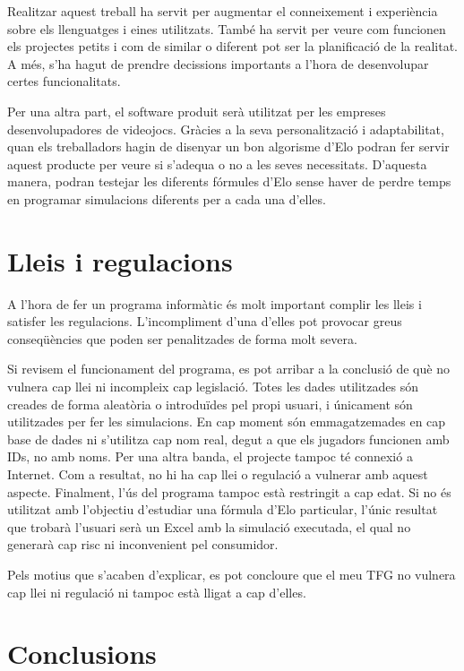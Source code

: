 \documentclass[a4paper]{article}
\begin{document}
Realitzar aquest treball ha servit per augmentar el conneixement i experiència sobre els llenguatges i eines utilitzats. També ha servit per veure com funcionen els projectes petits i com de similar o diferent pot ser la planificació de la realitat. A més, s'ha hagut de prendre decissions importants a l'hora de desenvolupar certes funcionalitats.

Per una altra part, el software produit serà utilitzat per les empreses desenvolupadores de videojocs. Gràcies a la seva personalització i adaptabilitat, quan els treballadors hagin de disenyar un bon algorisme d'Elo podran fer servir aquest producte per veure si s'adequa o no a les seves necessitats. D'aquesta manera, podran testejar les diferents fórmules d'Elo sense haver de perdre temps en programar simulacions diferents per a cada una d'elles.

\newpage
\section{Lleis i regulacions}
A l'hora de fer un programa informàtic és molt important complir les lleis i satisfer les regulacions. L'incompliment d'una d'elles pot provocar greus conseqüències que poden ser penalitzades de forma molt severa. 

Si revisem el funcionament del  programa, es pot arribar a la conclusió de què no vulnera cap llei ni incompleix cap legislació. Totes les dades utilitzades són creades de forma aleatòria o introduïdes pel propi usuari, i únicament són utilitzades per fer les simulacions. En cap moment són emmagatzemades en cap base de dades ni s'utilitza cap nom real, degut a que els jugadors funcionen amb IDs, no amb noms. 
Per una altra banda, el projecte tampoc té connexió a Internet. Com a resultat, no hi ha cap llei o regulació a vulnerar amb aquest aspecte. Finalment, l'ús del programa tampoc està restringit a cap edat. Si no és utilitzat amb l'objectiu d'estudiar una fórmula d'Elo particular, l'únic resultat que trobarà l'usuari serà un Excel amb la simulació executada, el qual no generarà cap risc ni inconvenient pel consumidor.

Pels motius que s'acaben d'explicar, es pot concloure que el meu TFG no vulnera cap llei ni regulació ni tampoc està lligat a cap d'elles.

\newpage
\section{Conclusions}
\end{document}
